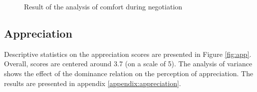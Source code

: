 \documentclass{llncs}
\begin{document}
\begin{figure}[h]
	
	
	\caption{Result of the analysis of comfort during negotiation}
	\label{tab:confort}
\end{figure}

\subsection{Appreciation}
Descriptive statistics on the appreciation scores are presented in Figure \ref{fig:app}. Overall, scores are centered around 3.7 (on a scale of 5). The analysis of variance shows the effect of the dominance relation on the perception of appreciation. The results are presented in appendix \ref{appendix:appreciation}.
\end{document}

